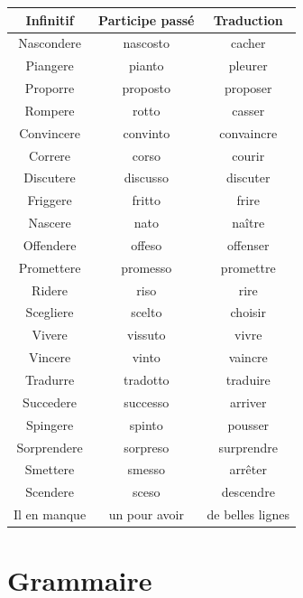 \documentclass[12pt, openany]{report}
\begin{document}
\begin{minipage}{.5\textwidth}
    \begin{center}
        \begin{tabular}{c|c|c}
            Infinitif & Participe passé & Traduction\\ \hline
            Nascondere & nascosto & cacher\\
            Piangere & pianto & pleurer\\
            Proporre & proposto & proposer\\
            Rompere & rotto & casser\\
            Convincere & convinto & convaincre\\
            Correre & corso & courir\\
            Discutere & discusso & discuter\\
            Friggere & fritto & frire\\
            Nascere & nato & naître\\
            Offendere & offeso & offenser\\
            Promettere & promesso & promettre\\
            Ridere & riso & rire\\
            Scegliere & scelto & choisir\\
            Vivere & vissuto & vivre\\
            Vincere & vinto & vaincre\\
            Tradurre & tradotto & traduire\\
            Succedere & successo & arriver\\
            Spingere & spinto & pousser\\
            Sorprendere & sorpreso & surprendre\\
            Smettere & smesso & arrêter\\
            Scendere & sceso & descendre\\
            Il en manque &un pour avoir &de belles lignes\\
        \end{tabular}
    \end{center}
\end{minipage}
\chapter{Grammaire}
\end{document}

